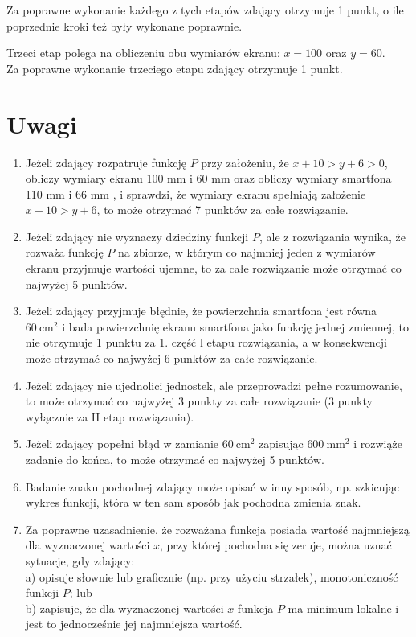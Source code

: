 \documentclass[10pt]{article}
\begin{document}
Za poprawne wykonanie każdego z tych etapów zdający otrzymuje 1 punkt, o ile poprzednie kroki też były wykonane poprawnie.

Trzeci etap polega na obliczeniu obu wymiarów ekranu: $x=100$ oraz $y=60$.\\
Za poprawne wykonanie trzeciego etapu zdający otrzymuje 1 punkt.

\section*{Uwagi}
\begin{enumerate}
  \item Jeżeli zdający rozpatruje funkcję $P$ przy założeniu, że $x+10>y+6>0$, obliczy wymiary ekranu 100 mm i 60 mm oraz obliczy wymiary smartfona 110 mm i 66 mm , i sprawdzi, że wymiary ekranu spełniają założenie $x+10>y+6$, to może otrzymać 7 punktów za całe rozwiązanie.
  \item Jeżeli zdający nie wyznaczy dziedziny funkcji $P$, ale z rozwiązania wynika, że rozważa funkcję $P$ na zbiorze, w którym co najmniej jeden z wymiarów ekranu przyjmuje wartości ujemne, to za całe rozwiązanie może otrzymać co najwyżej 5 punktów.
  \item Jeżeli zdający przyjmuje błędnie, że powierzchnia smartfona jest równa $60 \mathrm{~cm}^{2}$ i bada powierzchnię ekranu smartfona jako funkcję jednej zmiennej, to nie otrzymuje 1 punktu za 1. część l etapu rozwiązania, a w konsekwencji może otrzymać co najwyżej 6 punktów za całe rozwiązanie.
  \item Jeżeli zdający nie ujednolici jednostek, ale przeprowadzi pełne rozumowanie, to może otrzymać co najwyżej 3 punkty za całe rozwiązanie (3 punkty wyłącznie za II etap rozwiązania).
  \item Jeżeli zdający popełni błąd w zamianie $60 \mathrm{~cm}^{2}$ zapisując $600 \mathrm{~mm}^{2}$ i rozwiąże zadanie do końca, to może otrzymać co najwyżej 5 punktów.
  \item Badanie znaku pochodnej zdający może opisać w inny sposób, np. szkicując wykres funkcji, która w ten sam sposób jak pochodna zmienia znak.
  \item Za poprawne uzasadnienie, że rozważana funkcja posiada wartość najmniejszą dla wyznaczonej wartości $x$, przy której pochodna się zeruje, można uznać sytuacje, gdy zdający:\\
a) opisuje słownie lub graficznie (np. przy użyciu strzałek), monotoniczność funkcji $P$; lub\\
b) zapisuje, że dla wyznaczonej wartości $x$ funkcja $P$ ma minimum lokalne i jest to jednocześnie jej najmniejsza wartość.\\

\end{enumerate}
\end{document}

